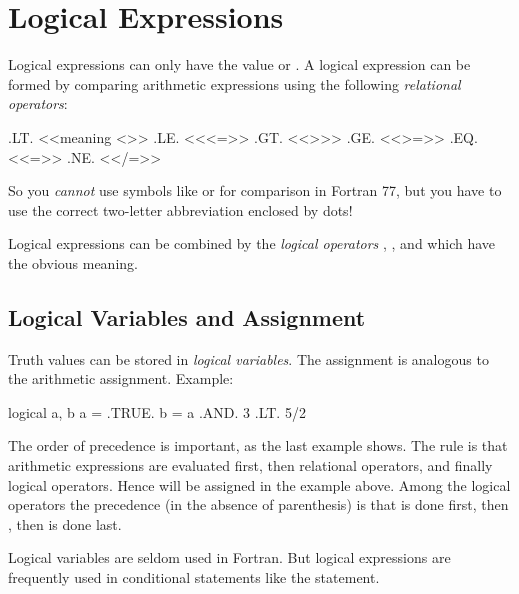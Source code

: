 \section{Logical Expressions}

Logical expressions can only have the value  or
. A logical expression can be formed by
comparing arithmetic expressions using the following \textit{relational
operators}:

\begin{fortran77}
      .LT.  <<meaning <>>
      .LE.          <<<=>>
      .GT.          <<>>>
      .GE.          <<>=>>
      .EQ.          <<=>>
      .NE.          <</=>>
\end{fortran77}

So you \textit{cannot} use symbols like \inlinefortranss{<} or
\inlinefortranss{=} for comparison in Fortran 77, but you have to use
the correct two-letter abbreviation enclosed by dots!

Logical expressions can be combined by the \textit{logical operators}
, , and
 which have the obvious meaning.


\subsection*{Logical Variables and Assignment}

Truth values can be stored in \textit{logical variables}. The assignment
is analogous to the arithmetic assignment. Example:

\begin{fortran77}
      logical a, b
      a = .TRUE.
      b = a .AND. 3 .LT. 5/2
\end{fortran77}

The order of precedence is important, as the last example shows. The
rule is that arithmetic expressions are evaluated first, then relational
operators, and finally logical operators. Hence  will
be assigned  in the example above. Among the
logical operators the precedence (in the absence of parenthesis) is that
 is done first, then ,
then  is done last.

Logical variables are seldom used in Fortran. But logical expressions
are frequently used in conditional statements like the
 statement.
